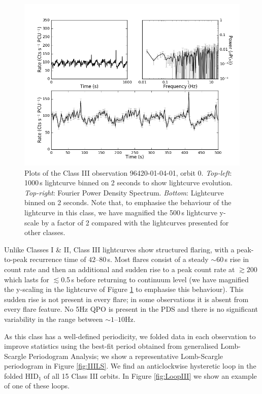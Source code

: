 \begin{figure}
    \includegraphics[width=0.8\columnwidth, trim = 0.6cm 0 3.9cm 0]{images/Gmulti.png}
    \captionsetup{singlelinecheck=off}
    \caption{Plots of the Class III observation 96420-01-04-01, orbit 0.  \textit{Top-left}: 1000\,s lightcurve binned on 2 seconds to show lightcurve evolution.  \textit{Top-right}: Fourier Power Density Spectrum.  \textit{Bottom}: Lightcurve binned on 2 seconds.  Note that, to emphasise the behaviour of the lightcurve in this class, we have magnified the 500\,s lightcurve y-scale by a factor of 2 compared with the lightcurves presented for other classes.}
   \label{fig:Gmulti}
\end{figure}

\par Unlike Classes I \& II, Class III lightcurves show structured flaring, with a peak-to-peak recurrence time of $42$--$80$\,s.  Most flares consist of a steady $\sim60$\,s rise in count rate and then an additional and sudden rise to a peak count rate at $\gtrsim200$\spcu which lasts for $\lesssim$0.5\,s before returning to continuum level (we have magnified the y-scaling in the lightcurve of Figure \ref{fig:Gmulti} to emphasise this behaviour). This sudden rise is not present in every flare; in some observations it is absent from every flare feature.  No 5Hz QPO is present in the PDS and there is no significant variability in the range between $\sim1\mbox{--}10$Hz.

\par As this class has a well-defined periodicity, we folded data in each observation to improve statistics using the best-fit period obtained from generalised Lomb-Scargle Periodogram Analysis; we show a representative Lomb-Scargle periodogram in Figure \ref{fig:IIILS}.  We find an anticlockwise hysteretic loop in the folded HID$_1$ of all 15 Class III orbits.  In Figure \ref{fig:LoopIII} we show an example of one of these loops.

